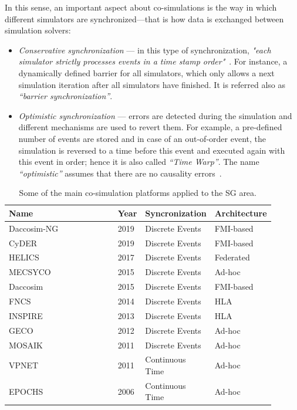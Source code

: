 \documentclass[1p]{elsarticle} %
\begin{document}
\noindent In this sense, an important aspect about co-simulations is the way in which different simulators are synchronized---that is how data is exchanged between simulation solvers:

\begin{itemize}
    \item \textit{Conservative synchronization} --- in this type of synchronization, \textit{"each simulator strictly processes events in a time stamp order"}~\citep{ref:cintuglu2017survey}. For instance, a dynamically defined barrier for all simulators, which only allows a next simulation iteration after all simulators have finished. It is referred also as \textit{“barrier synchronization”}.
    \item \textit{Optimistic synchronization} --- errors are detected during the simulation and different mechanisms are used to revert them. For example, a pre-defined number of events are stored and in case of an out-of-order event, the simulation is reversed to a time before this event and executed again with this event in order; hence it is also called \textit{“Time Warp”}. The name \textit{“optimistic”} assumes that there are no causality errors~\citep{ref:law2000simulation}.
\end{itemize}


\begin{table}[!htbp]
\caption{Some of the main co-simulation platforms applied to the SG area.}
\label{tbl:co-sim-platforms}
\footnotesize
\begin{tabular}{p{0.45\linewidth}p{0.10\linewidth}p{0.20\linewidth}p{0.15\linewidth}}
\toprule
\textbf{Name} &  \textbf{Year}&  \textbf{Syncronization} &  \textbf{Architecture}\\ 
\midrule
Daccosim-NG~\citep{ref:evora2019daccosim} & 2019 & Discrete Events & FMI-based\\
CyDER~\citep{ref:nouidui2019cyder} & 2019 & Discrete Events & FMI-based\\
HELICS~\citep{ref:palmintier2017design} & 2017 & Discrete Events & Federated\\
MECSYCO~\citep{ref:camus2016mecsyco} & 2015 & Discrete Events & Ad-hoc\\
Daccosim~\citep{ref:galtier2015fmi} & 2015 & Discrete Events & FMI-based\\
FNCS~\citep{ref:ciraci2014fncs} & 2014 & Discrete Events & HLA\\
INSPIRE~\citep{ref:georg2013inspire} & 2013 & Discrete Events & HLA\\
GECO~\citep{ref:lin2012geco} & 2012 & Discrete Events & Ad-hoc \\
MOSAIK~\citep{HLAarch2} & 2011 & Discrete Events & Ad-hoc\\
VPNET~\citep{ref:li2011vpnet} & 2011 & Continuous Time & Ad-hoc\\
EPOCHS~\citep{ref:hopkinson2006epochs} & 2006 & Continuous Time & Ad-hoc \\
\bottomrule
\end{tabular}
\end{table}
\end{document}

